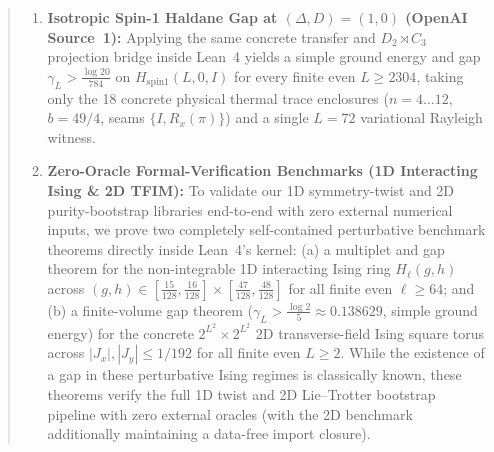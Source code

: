 \documentclass[11pt,a4paper]{article}
\begin{document}
\begin{abstract}
\begin{enumerate}[leftmargin=1.8em,itemsep=2pt]
  \item \textbf{Isotropic Spin-1 Haldane Gap at $(\Delta, D) = (1, 0)$ (OpenAI Source~1):} Applying the same concrete transfer and $D_2 \rtimes C_3$ projection bridge inside Lean~4 yields a simple ground energy and gap $\gamma_L > \frac{\log 20}{784}$ on $H_{\mathrm{spin1}}(L, 0, I)$ for every finite even $L \ge 2304$, taking only the 18 concrete physical thermal trace enclosures ($n = 4\ldots 12$, $b = 49/4$, seams $\{I, R_x(\pi)\}$) and a single $L = 72$ variational Rayleigh witness.
  \item \textbf{Zero-Oracle Formal-Verification Benchmarks (1D Interacting Ising \& 2D TFIM):} To validate our 1D symmetry-twist and 2D purity-bootstrap libraries end-to-end with zero external numerical inputs, we prove two completely self-contained perturbative benchmark theorems directly inside Lean~4's kernel: (a) a multiplet and gap theorem for the non-integrable 1D interacting Ising ring $H_\ell(g, h)$ across $(g, h) \in [\frac{15}{128}, \frac{16}{128}] \times [\frac{47}{128}, \frac{48}{128}]$ for all finite even $\ell \ge 64$; and (b) a finite-volume gap theorem ($\gamma_L > \frac{\log 2}{5} \approx 0.138629$, simple ground energy) for the concrete $2^{L^2} \times 2^{L^2}$ 2D transverse-field Ising square torus across $|J_x|, |J_y| \le 1/192$ for all finite even $L \ge 2$. While the existence of a gap in these perturbative Ising regimes is classically known, these theorems verify the full 1D twist and 2D Lie--Trotter bootstrap pipeline with zero external oracles (with the 2D benchmark additionally maintaining a data-free import closure).
\end{enumerate}
\end{abstract}
\end{document}
